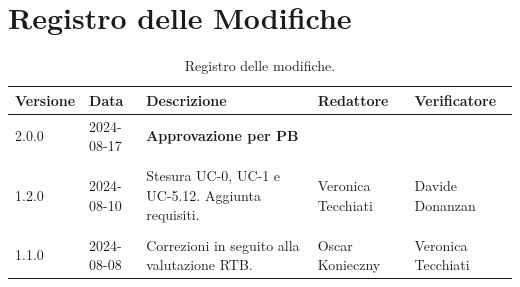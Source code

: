 \documentclass[8pt]{article}
\begin{document}
\section*{Registro delle Modifiche}
\begin{table}[ht!]	
	\centering
	\begin{tabular}{p{1.2cm} p{2cm} p{5cm} p{3cm} p{3cm}}
		\toprule
		\textbf{Versione}& \textbf{Data} & \textbf{Descrizione} & \textbf{Redattore} & \textbf{Verificatore} \\
		\midrule
            2.0.0 & 2024-08-17 & \textbf{Approvazione per PB} & &  \\\\
            1.2.0 & 2024-08-10 & Stesura UC-0, UC-1 e UC-5.12. Aggiunta requisiti. & Veronica Tecchiati & Davide Donanzan \\\\
			1.1.0 & 2024-08-08 & Correzioni in seguito alla valutazione RTB. & Oscar Konieczny & Veronica Tecchiati
 		    \\ %
		\bottomrule
	\end{tabular}
	\caption{Registro delle modifiche.}
	\label{table:Registro delle modifiche}
\end{table}
\clearpage
\end{document}
